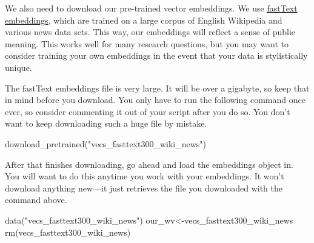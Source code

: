 \documentclass[
  letterpaper,
  DIV=11,
  numbers=noendperiod]{scrreprt}
\newenvironment{Shaded}{\begin{snugshade}}{\end{snugshade}}
\newcommand{\FunctionTok}[1]{\textcolor[rgb]{0.28,0.35,0.67}{#1}}
\newcommand{\NormalTok}[1]{\textcolor[rgb]{0.00,0.23,0.31}{#1}}
\newcommand{\OtherTok}[1]{\textcolor[rgb]{0.00,0.23,0.31}{#1}}
\newcommand{\StringTok}[1]{\textcolor[rgb]{0.13,0.47,0.30}{#1}}
\begin{document}
We also need to download our pre-trained vector embeddings. We use
\href{https://fasttext.cc/docs/en/english-vectors.html}{fastText
embeddings}, which are trained on a large corpus of English Wikipedia
and various news data sets. This way, our embeddings will reflect a
sense of public meaning. This works well for many research questions,
but you may want to consider training your own embeddings in the event
that your data is stylistically unique.

\begin{tcolorbox}[enhanced jigsaw, title=\textcolor{quarto-callout-caution-color}{\faFire}\hspace{0.5em}{Caution}, colbacktitle=quarto-callout-caution-color!10!white, left=2mm, opacityback=0, colback=white, coltitle=black, toprule=.15mm, opacitybacktitle=0.6, breakable, colframe=quarto-callout-caution-color-frame, rightrule=.15mm, toptitle=1mm, bottomtitle=1mm, titlerule=0mm, arc=.35mm, leftrule=.75mm, bottomrule=.15mm]

The fastText embeddings file is very large. It will be over a gigabyte,
so keep that in mind before you download. You only have to run the
following command once ever, so consider commenting it out of your
script after you do so. You don't want to keep downloading such a huge
file by mistake.

\end{tcolorbox}

\begin{Shaded}
\begin{Highlighting}[]
\FunctionTok{download\_pretrained}\NormalTok{(}\StringTok{"vecs\_fasttext300\_wiki\_news"}\NormalTok{)}
\end{Highlighting}
\end{Shaded}

After that finishes downloading, go ahead and load the embeddings object
in. You will want to do this anytime you work with your embeddings. It
won't download anything new---it just retrieves the file you downloaded
with the command above.

\begin{Shaded}
\begin{Highlighting}[]
\FunctionTok{data}\NormalTok{(}\StringTok{"vecs\_fasttext300\_wiki\_news"}\NormalTok{)}
\NormalTok{our\_wv}\OtherTok{\textless{}{-}}\NormalTok{vecs\_fasttext300\_wiki\_news}
\FunctionTok{rm}\NormalTok{(vecs\_fasttext300\_wiki\_news)}
\end{Highlighting}
\end{Shaded}
\end{document}
